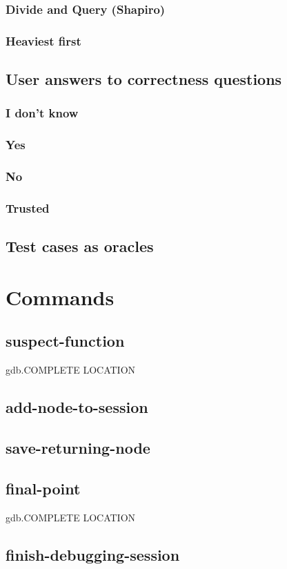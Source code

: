 \subsubsection{Divide and Query (Shapiro)}
\subsubsection{Heaviest first}
\subsection{User answers to correctness questions}
\subsubsection{I don't know}
\subsubsection{Yes}
\subsubsection{No}
\subsubsection{Trusted}
\subsection{Test cases as oracles}
\section{Commands}
\subsection{suspect-function}
gdb.COMPLETE LOCATION
\subsection{add-node-to-session}
\subsection{save-returning-node}
\subsection{final-point}
gdb.COMPLETE LOCATION
\subsection{finish-debugging-session}
